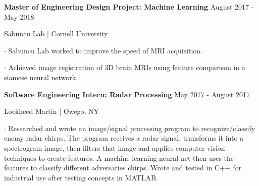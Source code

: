 \documentclass[11pt]{article} %
\begin{document}
    \textbf{\large Master of Engineering Design Project: Machine Learning} \hfill August 2017 - May 2018 \vspace{-0ex}
	\setlength{\parindent}{-0ex} \par
		Sabuncu Lab | Cornell University\vspace{+1ex} \par
		$\boldsymbol{\cdot}$ Sabuncu Lab worked to improve the speed of MRI acquisition. \par \vspace{+1ex}
		$\boldsymbol{\cdot}$ Achieved image registration of 3D brain MRIs using feature comparison in a siamese neural network. \par \vspace{+1ex}
	\textbf{\large Software Engineering Intern: Radar Processing} \hfill May 2017 - August 2017 \vspace{-0ex}
	\setlength{\parindent}{-0ex} \par
		Lockheed Martin | Owego, NY \vspace{+1ex} \par
		$\boldsymbol{\cdot}$ Researched and wrote an image/signal processing program to recognize/classify enemy radar chirps. The program receives a radar signal, transforms it into a spectrogram image, then filters that image and applies computer vision techniques to create  features. A machine learning neural net then uses the features to classify different adversaries chirps. Wrote and tested in C++ for industrial use after testing concepts in MATLAB.\par
		\vspace{-1ex}
	\setlength{\itemindent}{0in} 
	
\end{document}
